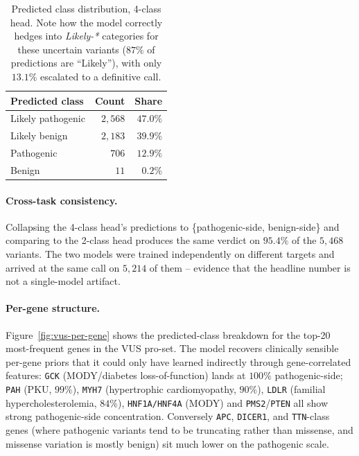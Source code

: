 \documentclass[11pt,a4paper]{article}
\begin{document}
\begin{table}[H]
\centering
\caption{Predicted class distribution, 4-class head. Note how the model
correctly hedges into \emph{Likely-*} categories for these uncertain
variants ($87\%$ of predictions are ``Likely''), with only $13.1\%$
escalated to a definitive call.}
\label{tab:vus-dist-4class}
\small
\begin{tabular}{lrr}
\toprule
Predicted class    & Count & Share \\
\midrule
Likely pathogenic  & $2{,}568$ & $47.0\%$ \\
Likely benign      & $2{,}183$ & $39.9\%$ \\
Pathogenic         & $706$     & $12.9\%$ \\
Benign             & $11$      & $0.2\%$  \\
\bottomrule
\end{tabular}
\end{table}

\paragraph{Cross-task consistency.}
Collapsing the 4-class head's predictions to \{pathogenic-side,
benign-side\} and comparing to the 2-class head produces the same verdict
on $95.4\%$ of the $5{,}468$ variants. The two models were trained
independently on different targets and arrived at the same call on
$5{,}214$ of them -- evidence that the headline number is not a
single-model artifact.

\paragraph{Per-gene structure.}
Figure~\ref{fig:vus-per-gene} shows the predicted-class breakdown for the
top-20 most-frequent genes in the VUS pro-set. The model recovers
clinically sensible per-gene priors that it could only have learned
indirectly through gene-correlated features: \texttt{GCK} (MODY/diabetes
loss-of-function) lands at $100\%$ pathogenic-side; \texttt{PAH} (PKU,
$99\%$), \texttt{MYH7} (hypertrophic cardiomyopathy, $90\%$),
\texttt{LDLR} (familial hypercholesterolemia, $84\%$),
\texttt{HNF1A/HNF4A} (MODY) and \texttt{PMS2}/\texttt{PTEN} all show
strong pathogenic-side concentration. Conversely \texttt{APC},
\texttt{DICER1}, and \texttt{TTN}-class genes (where pathogenic variants
tend to be truncating rather than missense, and missense variation is
mostly benign) sit much lower on the pathogenic scale.
\end{document}
